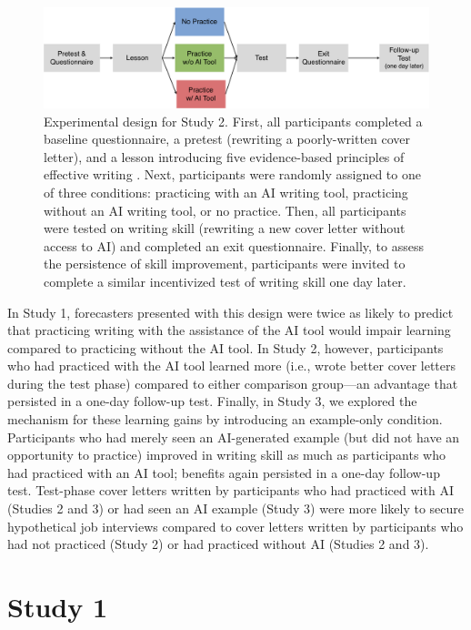 \documentclass[11pt]{report}
\begin{document}
\begin{mainf}
\begin{figure}[]
    \centering
    \includegraphics[width=.9\linewidth]{design_fig.pdf}
    \caption{Experimental design for Study 2. First, all participants completed a baseline questionnaire, a pretest (rewriting a poorly-written cover letter), and a lesson introducing five evidence-based principles of effective writing \cite{rogers2023}. Next, participants were randomly assigned to one of three conditions: practicing with an AI writing tool, practicing without an AI writing tool, or no practice. Then, all participants were tested on writing skill (rewriting a new cover letter without access to AI) and completed an exit questionnaire. Finally, to assess the persistence of skill improvement, participants were invited to complete a similar incentivized test of writing skill one day later.}
    \label{fig:design}
\end{figure}

In Study 1, forecasters presented with this design were twice as likely to predict that practicing writing with the assistance of the AI tool would impair learning compared to practicing without the AI tool. 
In Study 2, however, participants who had practiced with the AI tool learned more (i.e., wrote better cover letters during the test phase) compared to either comparison group---an advantage that persisted in a one-day follow-up test. 
Finally, in Study 3, we explored the mechanism for these learning gains by introducing an example-only condition. 
Participants who had merely seen an AI-generated example (but did not have an opportunity to practice) improved in writing skill as much as participants who had practiced with an AI tool; benefits again persisted in a one-day follow-up test. 
Test-phase cover letters written by participants who had practiced with AI (Studies 2 and 3) or had seen an AI example (Study 3) were more likely to secure hypothetical job interviews compared to cover letters written by participants who had not practiced (Study 2) or had practiced without AI (Studies 2 and 3).

\section{Study 1} 

\end{mainf}
\end{document}

